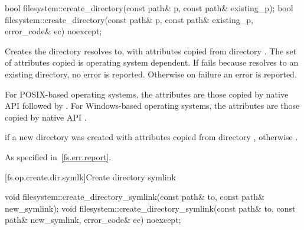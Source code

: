 %
\begin{itemdecl}
bool filesystem::create_directory(const path& p, const path& existing_p);
bool filesystem::create_directory(const path& p, const path& existing_p, error_code& ec) noexcept;
\end{itemdecl}

\begin{itemdescr}
\pnum
\effects
Creates the
  directory  resolves to, with
  attributes copied from directory . The set of attributes
  copied is operating system dependent.
  If  fails because  resolves to an existing directory,
  no error is reported. Otherwise on failure an error is reported.
\begin{note}
For POSIX-based operating systems, the
      attributes are those copied by native API 
      followed by . For
      Windows-based operating systems, the attributes are those copied by native
      API .
\end{note}

\pnum
\returns
{} if a new directory was created
  with attributes copied from directory ,
  otherwise .

\pnum
\throws
As specified in~\ref{fs.err.report}.
\end{itemdescr}


[fs.op.create.dir.symlk]{Create directory symlink}

%
\begin{itemdecl}
void filesystem::create_directory_symlink(const path& to, const path& new_symlink);
void filesystem::create_directory_symlink(const path& to, const path& new_symlink,
                                          error_code& ec) noexcept;
\end{itemdecl}

